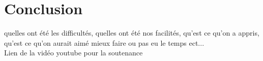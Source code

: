 \documentclass[12pt,a4paper]{report}
\begin{document}


\chapter{Conclusion}
quelles ont été les difficultés,
quelles ont été nos facilités,
qu'est ce qu'on a appris, 
qu'est ce qu'on aurait aimé mieux faire ou pas eu le temps ect... \\
Lien de la vidéo youtube pour la soutenance

%
\end{document}
